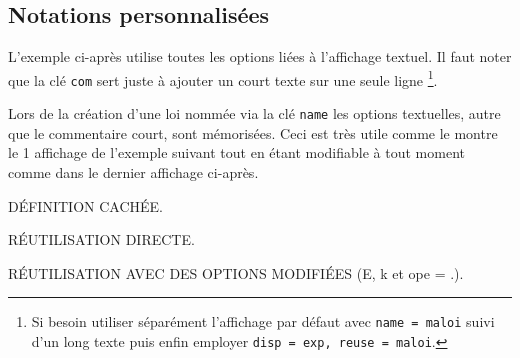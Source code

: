 \documentclass[12pt,a4paper]{article}
\begin{document}

\subsection{Notations personnalisées} \label{tnsproba-calclexpval-notations}


L'exemple ci-après utilise toutes les options liées à l'affichage textuel.
Il faut noter que la clé \verb#com# sert juste à ajouter un court texte sur une seule ligne
\footnote{
	Si besoin utiliser séparément l'affichage par défaut avec \texttt{name = maloi} suivi d'un long texte puis enfin employer \texttt{disp = exp, reuse = maloi}.
}.

\begin{latexex-flat}
\end{latexex-flat}





Lors de la création d'une loi nommée via la clé \verb#name# les options textuelles, autre que le commentaire court, sont mémorisées.
Ceci est très utile comme le montre le 1\ier{} affichage de l'exemple suivant tout en étant modifiable à tout moment comme dans le dernier affichage ci-après.

\begin{latexex-flat}
DÉFINITION CACHÉE.

\bigskip

RÉUTILISATION DIRECTE.
\calcexpval[reuse = option/texte/loi,
            disp  = all]{}

\bigskip

RÉUTILISATION AVEC DES OPTIONS MODIFIÉES (E, k et ope = .).
\calcexpval[reuse = option/texte/loi,
            disp  = all,
            E     = E,
            k     = k,
            com   = Le tableau précédent aboutit aux calculs suivants.,
            ope   = \cdot]{}
\end{latexex-flat}
\end{document}
